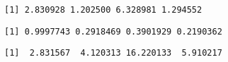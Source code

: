 \documentclass[]{book}
\newenvironment{Shaded}{\begin{snugshade}}{\end{snugshade}}
\newcommand{\KeywordTok}[1]{\textcolor[rgb]{0.13,0.29,0.53}{\textbf{#1}}}
\newcommand{\DataTypeTok}[1]{\textcolor[rgb]{0.13,0.29,0.53}{#1}}
\newcommand{\CommentTok}[1]{\textcolor[rgb]{0.56,0.35,0.01}{\textit{#1}}}
\newcommand{\OperatorTok}[1]{\textcolor[rgb]{0.81,0.36,0.00}{\textbf{#1}}}
\newcommand{\NormalTok}[1]{#1}
\theoremstyle{definition}
\theoremstyle{definition}
\theoremstyle{definition}
\theoremstyle{remark}
\begin{document}
\begin{verbatim}
[1] 2.830928 1.202500 6.328981 1.294552
\end{verbatim}

\begin{Shaded}
\end{Shaded}

\begin{verbatim}
[1] 0.9997743 0.2918469 0.3901929 0.2190362
\end{verbatim}

\begin{Shaded}
\end{Shaded}

\begin{verbatim}
[1]  2.831567  4.120313 16.220133  5.910217
\end{verbatim}
\end{document}
